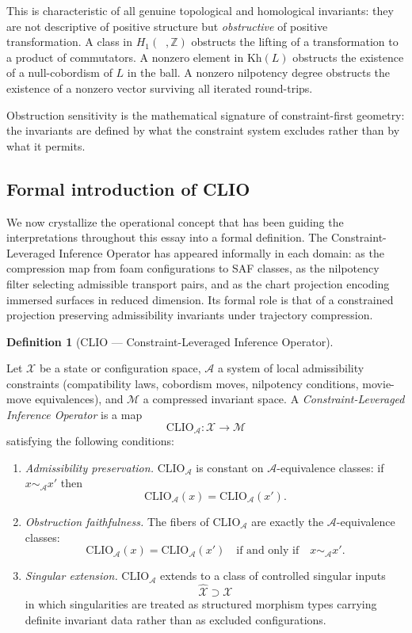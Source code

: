\documentclass[12pt, a4paper]{article}
\theoremstyle{plain}
\theoremstyle{definition}
\newtheorem{definition}[theorem]{Definition}
\theoremstyle{correspondence}
\DeclareMathOperator{\AutIET}{Aut_{IET}}
\newcommand{\ZZ}{\mathbb{Z}}
\newcommand{\Kh}{\mathrm{Kh}}
\newcommand{\CLIO}{\mathrm{CLIO}}
\newcommand{\calX}{\mathcal{X}}
\newcommand{\calM}{\mathcal{M}}
\newcommand{\calA}{\mathcal{A}}
\begin{document}
This is characteristic of all genuine topological and homological invariants: they are
not descriptive of positive structure but \emph{obstructive} of positive transformation.
A class in $H_1(\AutIET, \ZZ)$ obstructs the lifting of a transformation to a product
of commutators. A nonzero element in $\Kh(L)$ obstructs the existence of a null-cobordism
of $L$ in the ball. A nonzero nilpotency degree obstructs the existence of a nonzero
vector surviving all iterated round-trips.

Obstruction sensitivity is the mathematical signature of constraint-first geometry: the
invariants are defined by what the constraint system excludes rather than by what it
permits.

\subsection{Formal introduction of CLIO}

We now crystallize the operational concept that has been guiding the interpretations
throughout this essay into a formal definition. The Constraint-Leveraged Inference
Operator has appeared informally in each domain: as the compression map from foam
configurations to SAF classes, as the nilpotency filter selecting admissible transport
pairs, and as the chart projection encoding immersed surfaces in reduced dimension.
Its formal role is that of a constrained projection preserving admissibility invariants
under trajectory compression.

\begin{definition}[CLIO --- Constraint-Leveraged Inference Operator]
\label{def:CLIO}

Let $\calX$ be a state or configuration space, $\calA$ a system of local admissibility
constraints (compatibility laws, cobordism moves, nilpotency conditions, movie-move
equivalences), and $\calM$ a compressed invariant space. A \emph{Constraint-Leveraged
Inference Operator} is a map
\[
\CLIO_{\calA} : \calX \to \calM
\]
satisfying the following conditions:

\begin{enumerate}

\item \emph{Admissibility preservation.}
$\CLIO_{\calA}$ is constant on $\calA$-equivalence classes: if
$x \sim_{\calA} x'$ then
\[
\CLIO_{\calA}(x)=\CLIO_{\calA}(x').
\]

\item \emph{Obstruction faithfulness.}
The fibers of $\CLIO_{\calA}$ are exactly the
$\calA$-equivalence classes:
\[
\CLIO_{\calA}(x)=\CLIO_{\calA}(x')
\quad \text{if and only if} \quad
x \sim_{\calA} x'.
\]

\item \emph{Singular extension.}
$\CLIO_{\calA}$ extends to a class of controlled
singular inputs
\[
\hat{\calX} \supset \calX
\]
in which singularities are treated as structured morphism types carrying definite
invariant data rather than as excluded configurations.

\end{enumerate}

\end{definition}
\end{document}
